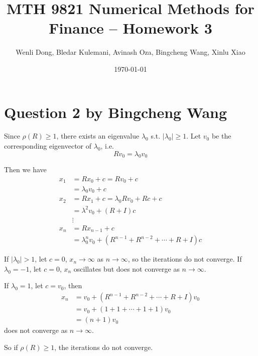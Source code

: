 \documentclass{article}
\title{MTH 9821 Numerical Methods for Finance -- Homework 3}
\author{Wenli Dong, Bledar Kulemani, Avinash Oza, Bingcheng Wang, Xinlu Xiao}
\date{\today}
\DeclareMathOperator{\1}{\mathit{1}}
\numberwithin{figure}{section} %
\numberwithin{table}{section}
\begin{document}
\maketitle

\section{Question 2 by Bingcheng Wang}

Since $\rho(R)\geq 1$, there exists an eigenvalue $\lambda_0$ s.t. $|\lambda_0|\geq 1$. Let $v_0$ be the corresponding eigenvector of $\lambda_0$, i.e.
	\[
	Rv_0=\lambda_0v_0
	\]

Then we have
	\begin{align*}
	x_1 &= Rx_0 + c = Rv_0+c\\&
	 = \lambda_0v_0+c \\
	x_2 &= Rx_1 + c = \lambda_0Rv_0+Rc+c \\&
	= \lambda^2v_0+(R+I)c \\
	&\vdots\\
	x_n &= Rx_{n-1}+c \\&
	= \lambda_0^nv_0+(R^{n-1}+R^{n-2}+\cdots + R+I)c
	\end{align*}

If $|\lambda_0|>1$, let $c=0$, $x_n \to \infty$ as $n \to \infty$, so the iterations do not converge. If $\lambda_0 =-1$, let $c=0$, $x_n$ oscillates but 
does not converge as $n \to \infty$.

If $\lambda_0 = 1$, let $c=v_0$, then
\begin{align*}
 x_n &= v_0+(R^{n-1}+R^{n-2}+\cdots + R+I)v_0 \\
     &= v_0+(1+1+\cdots +1 + 1)v_0 \\
     &= (n+1)v_0
\end{align*}
does not converge as $n \to \infty$. 

So if $\rho(R)\geq 1$, the iterations do not converge.
\end{document}
